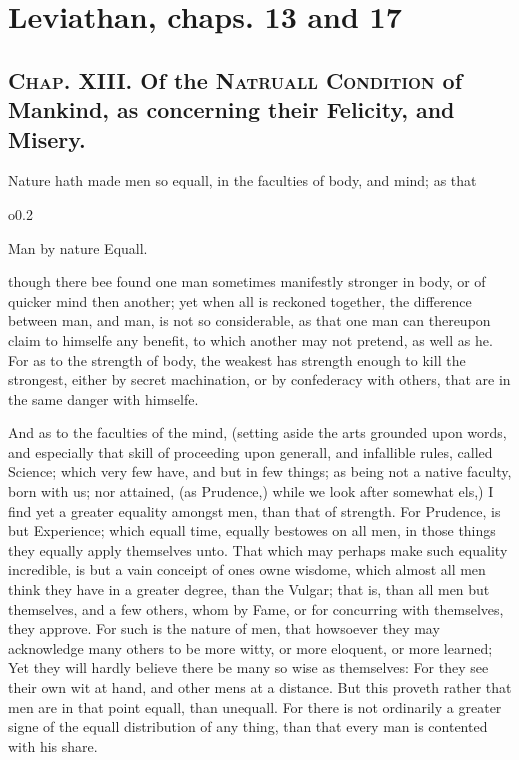 
\author{Thomas Hobbes}
\chapter[Thomas Hobbes -- Leviathan, chaps. 13 and 17]{Leviathan,
chaps. 13 and 17}


\section*{\textsc{Chap}. XIII. Of the \textsc{Natruall
Condition} of Mankind, as concerning their Felicity, and Misery.}

Nature hath made men so equall, in the faculties of body, and mind; as
that \begin{wrapfigure}[4]{o}{0.2\textwidth}\raggedright Man by nature
Equall. \end{wrapfigure} though there bee found one man sometimes
manifestly stronger in body, or of quicker mind then another; yet when
all is reckoned together, the difference between man, and man, is not
so considerable, as that one man can thereupon claim to himselfe any
benefit, to which another may not pretend, as well as he. For as to
the strength of body, the weakest has strength enough to kill the
strongest, either by secret machination, or by confederacy with
others, that are in the same danger with himselfe.

And as to the faculties of the mind, (setting aside the arts
grounded upon words, and especially that skill of proceeding upon
generall, and infallible rules, called Science; which very few have,
and but in few things; as being not a native faculty, born with us;
nor attained, (as Prudence,) while we look after somewhat els,) I find
yet a greater equality amongst men, than that of strength. For
Prudence, is but Experience; which equall time, equally bestowes on
all men, in those things they equally apply themselves unto. That
which may perhaps make such equality incredible, is but a vain
conceipt of ones owne wisdome, which almost all men think they have
in a greater degree, than the Vulgar; that is, than all men but
themselves, and a few others, whom by Fame, or for concurring with
themselves, they approve. For such is the nature of men, that
howsoever they may acknowledge many others to be more witty, or more
eloquent, or more learned; Yet they will hardly believe there be many
so wise as themselves: For they see their own wit at hand, and other
mens at a distance. But this proveth rather that men are in that
point equall, than unequall. For there is not ordinarily a greater
signe of the equall distribution of any thing, than that every man is
contented with his share.

